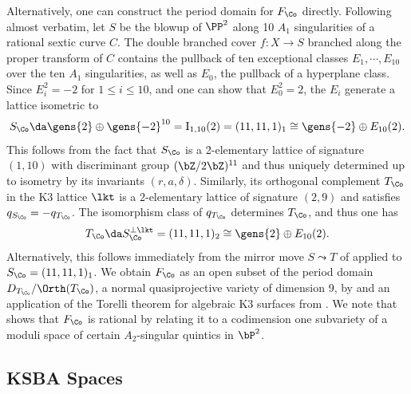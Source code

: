 \documentclass[../main.tex]{subfiles}
\begin{document}
Alternatively, one can construct the period domain for $F_\Co$ directly. Following \cite[Prop. 3.1]{DK13} almost verbatim, let $S$ be the blowup of $\PP^2$ along 10 $A_1$ singularities of a rational sextic curve $C$. The double branched cover $f:X\to S$ branched along the proper transform of $C$ contains the pullback of ten exceptional classes $E_1,\cdots, E_{10}$ over the ten $A_1$ singularities, as well as $E_0$, the pullback of a hyperplane class. Since $E_i^2 = -2$ for $1\leq i \leq 10$, and one can show that $E_0^2 = 2$, the $E_i$ generate a lattice isometric to \[S_\Co \da \gens{2}\oplus \gens{-2}^{10} = \mathrm{I}_{1, 10}(2) = (11, 11, 1)_1 \cong \gens{-2} \oplus E_{10}(2).\] 
This follows from the fact that $S_{\Co}$ is a 2-elementary lattice of signature $(1, 10)$ with discriminant group $(\bZ/2\bZ)^{11}$ and thus uniquely determined up to isometry by its invariants $(r,a,\delta)$. Similarly, its orthogonal complement $T_{\Co}$ in the K3 lattice $\lkt$ is a 2-elementary lattice of signature $(2, 9)$ and satisfies $q_{S_{\Co}} = -q_{T_{\Co}}$. The isomorphism class of $q_{T_{\Co}}$ determines $T_\Co$, and thus one has
\[
T_\Co \da S_\Co^{\perp \lkt} = (11, 11, 1)_2 \cong \gens{2} \oplus E_{10}(2)
.\]
Alternatively, this follows immediately from the mirror move $S\leadsto T$ of \cite[Thm. 5.10]{AE22} applied to $S_\Co =(11, 11, 1)_1$.
We obtain $F_\Co$ as an open subset of the period domain $D_{T_\Co}/\Orth(T_\Co)$, a normal quasiprojective variety of dimension 9, by \cite[Prop. 3.2]{DK13} and an application of the Torelli theorem for algebraic K3 surfaces from \cite{PS71}. We note that \cite{DK13} shows that $F_\Co$ is rational by relating it to a codimension one subvariety of a moduli space of certain $A_2$-singular quintics in $\bP^2$.



\subsection{KSBA Spaces}
\end{document}
